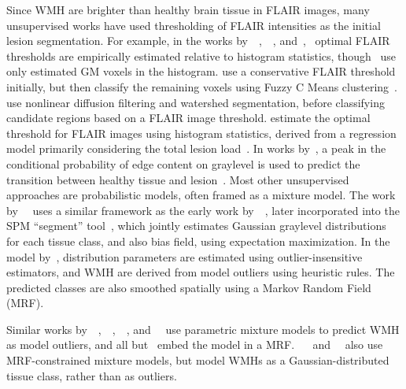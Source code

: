 Since WMH are brighter than healthy brain tissue in FLAIR images, many unsupervised works have used thresholding of FLAIR intensities as the initial lesion segmentation.
For example, in the works by~\citeauthor{Jack2001}~\cite{Jack2001},~\citeauthor{DeBoer2009b}~\cite{DeBoer2009b}, and~\citeauthor{Smart2011},~\cite{Smart2011} optimal FLAIR thresholds are empirically estimated relative to histogram statistics, though~\citeauthor{DeBoer2009b} use only estimated GM voxels in the histogram.
\citeauthor{Gibson2010} use a conservative FLAIR threshold initially, but then classify the remaining voxels using Fuzzy C Means clustering~\cite{Gibson2010}.
\citeauthor{Samaille2012} use nonlinear diffusion filtering and watershed segmentation, before classifying candidate regions based on a FLAIR image threshold.
\citeauthor{Yoo2014} estimate the optimal threshold for FLAIR images using histogram statistics, derived from a regression model primarily considering the total lesion load~\cite{Yoo2014}.
In works by~\citeauthor{Khademi2014}, a peak in the conditional probability of edge content on graylevel is used to predict the transition between healthy tissue and lesion~\cite{Khademi2014,Khademi2015,Knight2016a}.
Most other unsupervised approaches are probabilistic models, often framed as a mixture model.
The work by~\citeauthor{VanLeemput2001}~\cite{VanLeemput2001} uses a similar framework as the early work by~\citeauthor{Ashburner1997}~\cite{Ashburner1997}, later incorporated into the SPM ``segment'' tool~\cite{Ashburner2005}, which jointly estimates Gaussian graylevel distributions for each tissue class, and also bias field, using expectation maximization. In the model by~\citeauthor{VanLeemput2001}, distribution parameters are estimated using outlier-insensitive estimators, and WMH are derived from model outliers using heuristic rules. The predicted classes are also smoothed spatially using a Markov Random Field (MRF).
\par
Similar works by~\citeauthor{Bricq2008}~\cite{Bricq2008},~\citeauthor{Schmidt2012}~\cite{Schmidt2012},~\citeauthor{Jain2015}~\cite{Jain2015}, and~\citeauthor{Roura2015}~\cite{Roura2015} use parametric mixture models to predict WMH as model outliers, and all but~\cite{Roura2015} embed the model in a MRF\@.
~\citeauthor{Khayati2008}~\cite{Khayati2008} and~\citeauthor{Subbanna2009}~\cite{Subbanna2009} also use MRF-constrained mixture models, but model WMHs as a Gaussian-distributed tissue class, rather than as outliers.
